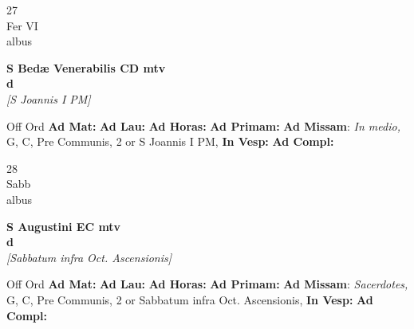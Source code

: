 \documentclass[10pt, openany]{book}
\begin{document}
    \begin{center}
        \begin{minipage}{3.5in}
            \vspace{2em}
            \begin{minipage}{0.5in}
                {\Huge 27} \\
                {\normalsize Fer VI} \\
                {\normalsize albus}
            \end{minipage}
            \begin{minipage}{3.0in}
                \textbf{ \large S Bedæ Venerabilis CD mtv \\
                \textnormal{\normalsize d}} \\ \textit{[S Joannis I PM]} \\ 
            \end{minipage}
            \begin{justify}Off Ord
                \textbf{Ad Mat: }
                \textbf{Ad Lau: }
                \textbf{Ad Horas: }
                \textbf{Ad Primam: }\textbf{Ad Missam}: \textit{In medio,} G, C, Pre Communis, 2 or S Joannis I PM,  
                \textbf{In Vesp: }
                \textbf{Ad Compl: }
            \end{justify}
        \end{minipage}
    \end{center}

    \begin{center}
        \begin{minipage}{3.5in}
            \vspace{2em}
            \begin{minipage}{0.5in}
                {\Huge 28} \\
                {\normalsize Sabb} \\
                {\normalsize albus}
            \end{minipage}
            \begin{minipage}{3.0in}
                \textbf{ \large S Augustini EC mtv \\
                \textnormal{\normalsize d}} \\ \textit{[Sabbatum infra Oct. Ascensionis]} \\ 
            \end{minipage}
            \begin{justify}Off Ord
                \textbf{Ad Mat: }
                \textbf{Ad Lau: }
                \textbf{Ad Horas: }
                \textbf{Ad Primam: }\textbf{Ad Missam}: \textit{Sacerdotes,} G, C, Pre Communis, 2 or Sabbatum infra Oct. Ascensionis,  
                \textbf{In Vesp: }
                \textbf{Ad Compl: }
            \end{justify}
        \end{minipage}
    \end{center}
\end{document}
